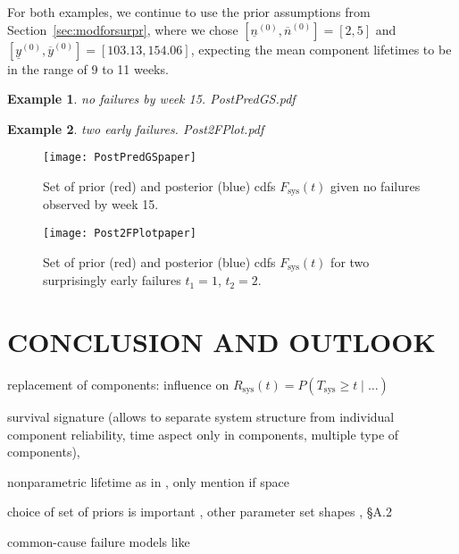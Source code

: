 \documentclass[12pt,a4paper,twocolumn,fleqn]{narms}
\newcommand{\uz}{^{(0)}} %
\newcommand{\ul}[1]{\underline{#1}}
\newcommand{\ol}[1]{\overline{#1}}
\def\yzl{\ul{y}\uz}
\def\yzu{\ol{y}\uz}
\def\nzl{\ul{n}\uz}
\def\nzu{\ol{n}\uz}
\newcommand{\comments}[1]{{\small\color{gray} #1}}
\newtheorem{example}{Example}
\begin{document}
For both examples, we continue to use the prior assumptions from Section~\ref{sec:modforsurpr},
where we chose $[\nzl, \nzu] = [2,5]$ and $[\yzl, \yzu] = [103.13, 154.06]$,
expecting the mean component lifetimes to be in the range of 9 to 11 weeks.

\begin{example}
no failures by week 15. PostPredGS.pdf
\end{example}

\begin{example}
two early failures. Post2FPlot.pdf
\end{example}

\begin{figure}
\texttt{[image: PostPredGSpaper]}
\caption{Set of prior (red) and posterior (blue) cdfs $F_\text{sys}(t)$ given no failures observed by week 15.}
\label{fig:examplenofailures}
\end{figure}

\begin{figure}
\texttt{[image: Post2FPlotpaper]}
\caption{Set of prior (red) and posterior (blue) cdfs $F_\text{sys}(t)$ for two surprisingly early failures $t_1 = 1$, $t_2 = 2$.}
\label{fig:exampletwoearlyfailures}
\end{figure}

\section{CONCLUSION AND OUTLOOK}
\label{sec:conclusion}

replacement of components: influence on $R_\text{sys}(t) = P(T_\text{sys} \geq t \mid \ldots)$ 

survival signature \cite{2012:survsign} (allows to separate system structure from individual component reliability,
time aspect only in components, multiple type of components),

nonparametric lifetime as in , \comments{only mention if space}

choice of set of priors is important \cite{1991:pericchi},
other parameter set shapes \cite{Walter2011a}, \cite{diss} \S A.2

common-cause failure models like \cite{Troffaes2014a,2015:coolen-commoncause}



\end{document}
